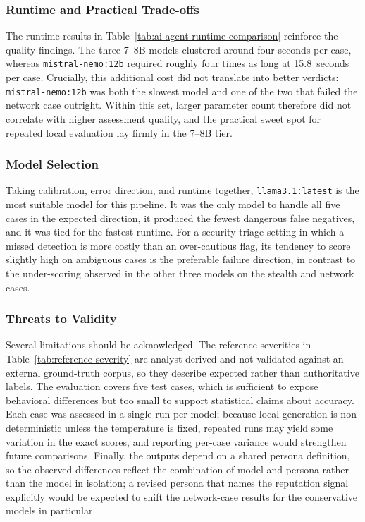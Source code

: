 \subsubsection{Runtime and Practical Trade-offs}
\noindent
The runtime results in Table~\ref{tab:ai-agent-runtime-comparison} reinforce the
quality findings. The three 7--8B models clustered around four seconds per case,
whereas \texttt{mistral-nemo:12b} required roughly four times as long at
15.8~seconds per case. Crucially, this additional cost did not translate into
better verdicts: \texttt{mistral-nemo:12b} was both the slowest model and one of
the two that failed the network case outright. Within this set, larger parameter
count therefore did not correlate with higher assessment quality, and the
practical sweet spot for repeated local evaluation lay firmly in the 7--8B tier.

\subsubsection{Model Selection}
\noindent
Taking calibration, error direction, and runtime together,
\texttt{llama3.1:latest} is the most suitable model for this pipeline. It was the
only model to handle all five cases in the expected direction, it produced the
fewest dangerous false negatives, and it was tied for the fastest runtime. For a
security-triage setting in which a missed detection is more costly than an
over-cautious flag, its tendency to score slightly high on ambiguous cases is the
preferable failure direction, in contrast to the under-scoring observed in the
other three models on the stealth and network cases.

\subsubsection{Threats to Validity}
\noindent
Several limitations should be acknowledged. The reference severities in
Table~\ref{tab:reference-severity} are analyst-derived and not validated against
an external ground-truth corpus, so they describe expected rather than
authoritative labels. The evaluation covers five test cases, which is sufficient
to expose behavioral differences but too small to support statistical claims
about accuracy. Each case was assessed in a single run per model; because local
generation is non-deterministic unless the temperature is fixed, repeated runs
may yield some variation in the exact scores, and reporting per-case variance
would strengthen future comparisons. Finally, the outputs depend on a shared
persona definition, so the observed differences reflect the combination of model
and persona rather than the model in isolation; a revised persona that names the
reputation signal explicitly would be expected to shift the network-case results
for the conservative models in particular.

